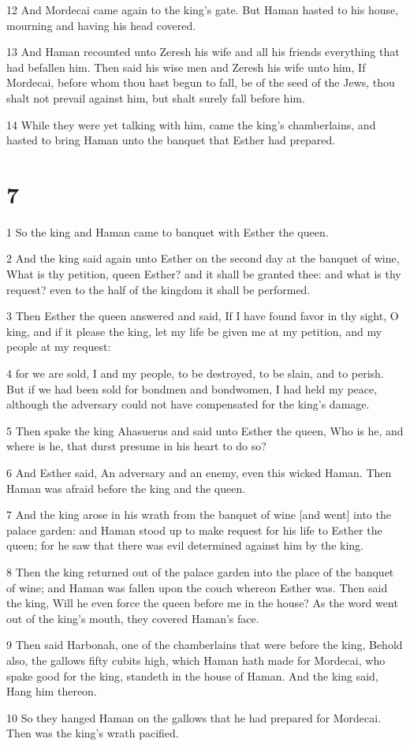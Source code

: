 \par 12 And Mordecai came again to the king's gate. But Haman hasted to his house, mourning and having his head covered.
\par 13 And Haman recounted unto Zeresh his wife and all his friends everything that had befallen him. Then said his wise men and Zeresh his wife unto him, If Mordecai, before whom thou hast begun to fall, be of the seed of the Jews, thou shalt not prevail against him, but shalt surely fall before him.
\par 14 While they were yet talking with him, came the king's chamberlains, and hasted to bring Haman unto the banquet that Esther had prepared.

\chapter{7}

\par 1 So the king and Haman came to banquet with Esther the queen.
\par 2 And the king said again unto Esther on the second day at the banquet of wine, What is thy petition, queen Esther? and it shall be granted thee: and what is thy request? even to the half of the kingdom it shall be performed.
\par 3 Then Esther the queen answered and said, If I have found favor in thy sight, O king, and if it please the king, let my life be given me at my petition, and my people at my request:
\par 4 for we are sold, I and my people, to be destroyed, to be slain, and to perish. But if we had been sold for bondmen and bondwomen, I had held my peace, although the adversary could not have compensated for the king's damage.
\par 5 Then spake the king Ahasuerus and said unto Esther the queen, Who is he, and where is he, that durst presume in his heart to do so?
\par 6 And Esther said, An adversary and an enemy, even this wicked Haman. Then Haman was afraid before the king and the queen.
\par 7 And the king arose in his wrath from the banquet of wine [and went] into the palace garden: and Haman stood up to make request for his life to Esther the queen; for he saw that there was evil determined against him by the king.
\par 8 Then the king returned out of the palace garden into the place of the banquet of wine; and Haman was fallen upon the couch whereon Esther was. Then said the king, Will he even force the queen before me in the house? As the word went out of the king's mouth, they covered Haman's face.
\par 9 Then said Harbonah, one of the chamberlains that were before the king, Behold also, the gallows fifty cubits high, which Haman hath made for Mordecai, who spake good for the king, standeth in the house of Haman. And the king said, Hang him thereon.
\par 10 So they hanged Haman on the gallows that he had prepared for Mordecai. Then was the king's wrath pacified.

